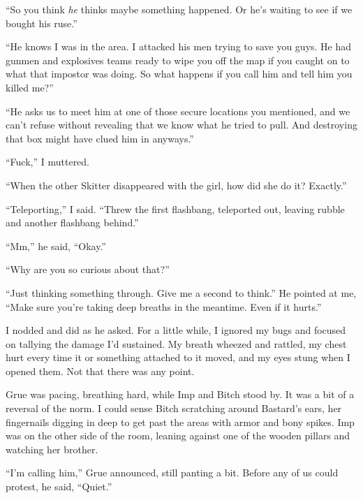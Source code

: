 ``So you think \emph{he} thinks maybe something happened.  Or he's waiting to see if we bought his ruse.''



``He knows I was in the area.  I attacked his men trying to save you guys.  He had gunmen and explosives teams ready to wipe you off the map if you caught on to what that impostor was doing.  So what happens if you call him and tell him you killed me?''



``He asks us to meet him at one of those secure locations you mentioned, and we can't refuse without revealing that we know what he tried to pull.  And destroying that box might have clued him in anyways.''



``Fuck,'' I muttered.



``When the other Skitter disappeared with the girl, how did she do it?  Exactly.''



``Teleporting,'' I said.  ``Threw the first flashbang, teleported out, leaving rubble and another flashbang behind.''



``Mm,'' he said, ``Okay.''



``Why are you so curious about that?''



``Just thinking something through.  Give me a second to think.''  He pointed at me, ``Make sure you're taking deep breaths in the meantime.  Even if it hurts.''



I nodded and did as he asked.  For a little while, I ignored my bugs and focused on tallying the damage I'd sustained.  My breath wheezed and rattled, my chest hurt every time it or something attached to it moved, and my eyes stung when I opened them.  Not that there was any point.



Grue was pacing, breathing hard, while Imp and Bitch stood by.  It was a bit of a reversal of the norm.  I could sense Bitch scratching around Bastard's ears, her fingernails digging in deep to get past the areas with armor and bony spikes.  Imp was on the other side of the room, leaning against one of the wooden pillars and watching her brother.



``I'm calling him,'' Grue announced, still panting a bit.  Before any of us could protest, he said, ``Quiet.''



